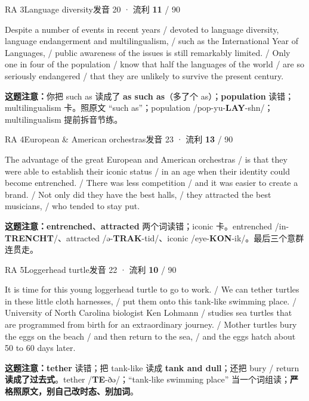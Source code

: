 \documentclass[11pt]{article}
\newcommand{\szero}[1]{\textcolor{cWrong}{\bfseries #1}}
\newcommand{\hl}[1]{\textcolor{cWrong}{\bfseries #1}}   %
\begin{document}
\begin{qblock}{RA 3\quad Language diversity}{发音 20 · 流利 \szero{11} / 90}
\begin{promptbox}\small
Despite a number of events in recent years / devoted to language diversity, language endangerment and multilingualism, / such as the International Year of Languages, / public awareness of the issues is still remarkably limited. / Only one in four of the population / know that half the languages of the world / are so seriously endangered / that they are unlikely to survive the present century.
\end{promptbox}
\textbf{这题注意：}你把 such as 读成了 \hl{as such as}（多了个 as）；\hl{population} 读错；multilingualism 卡。照原文 ``such as''；population /pop-yu-\textbf{LAY}-shn/；multilingualism 提前拆音节练。
\end{qblock}

\begin{qblock}{RA 4\quad European \& American orchestras}{发音 23 · 流利 \szero{13} / 90}
\begin{promptbox}\small
The advantage of the great European and American orchestras / is that they were able to establish their iconic status / in an age when their identity could become entrenched. / There was less competition / and it was easier to create a brand. / Not only did they have the best halls, / they attracted the best musicians, / who tended to stay put.
\end{promptbox}
\textbf{这题注意：}\hl{entrenched}、\hl{attracted} 两个词读错；iconic 卡。entrenched /in-\textbf{TRENCHT}/、attracted /ə-\textbf{TRAK}-tid/、iconic /eye-\textbf{KON}-ik/。最后三个意群连贯走。
\end{qblock}

\begin{qblock}{RA 5\quad Loggerhead turtle}{发音 22 · 流利 \szero{10} / 90}
\begin{promptbox}\small
It is time for this young loggerhead turtle to go to work. / We can tether turtles in these little cloth harnesses, / put them onto this tank-like swimming place. / University of North Carolina biologist Ken Lohmann / studies sea turtles that are programmed from birth for an extraordinary journey. / Mother turtles bury the eggs on the beach / and then return to the sea, / and the eggs hatch about 50 to 60 days later.
\end{promptbox}
\textbf{这题注意：}\hl{tether} 读错；把 tank-like 读成 \hl{tank and dull}；还把 bury / return \textbf{读成了过去式}。tether /\textbf{TE}-ðə/；``tank-like swimming place'' 当一个词组读；\textbf{严格照原文，别自己改时态、别加词}。
\end{qblock}
\end{document}

